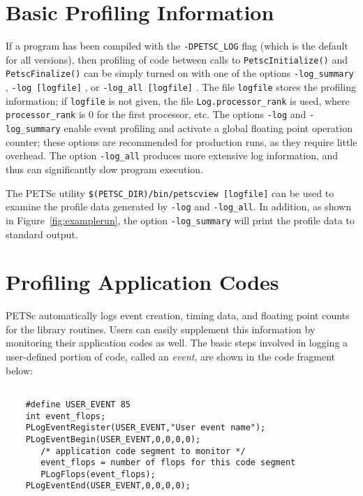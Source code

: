 \section{Basic Profiling Information}

   If a program
has been compiled with the {\tt -DPETSC\_LOG} flag (which is the
default for all versions), then profiling of code between calls to
{\tt PetscInitialize()} and {\tt PetscFinalize()} can be  
simply turned on with one of the options {\tt -log\_summary} 
, {\tt -log [logfile]} , or
{\tt -log\_all [logfile]} .  The file {\tt logfile}
stores the profiling information; if {\tt logfile} is not given, the
file {\tt Log.processor\_rank} is used, where {\tt processor\_rank} is
0 for the first processor, etc.  The options {\tt -log} and 
{\tt -log\_summary} enable event profiling and activate a global floating
point operation counter; these options are recommended for production
runs, as they require little overhead.  The option {\tt -log\_all}
produces more extensive log information, and thus can significantly
slow program execution.

The PETSc utility {\tt \$(PETSC\_DIR)/bin/petscview [logfile]}
 can be used to examine the profile data generated by
{\tt -log} and {\tt -log\_all}. In addition, as shown in 
Figure~\ref{fig:examplerun}, the option 
{\tt -log\_summary}  
will print the profile data to standard output.

\section{Profiling Application Codes}

PETSc automatically logs event creation, timing data, and floating
point counts for the library routines. Users can easily supplement
this information by monitoring their application codes as well.  
The basic steps involved in logging a
user-defined portion of code, called an {\em event}, are shown in the 
code fragment below:
\begin{verbatim}

    #define USER_EVENT 85
    int event_flops;
    PLogEventRegister(USER_EVENT,"User event name");
    PLogEventBegin(USER_EVENT,0,0,0,0);
       /* application code segment to monitor */
       event_flops = number of flops for this code segment
       PLogFlops(event_flops);
    PLogEventEnd(USER_EVENT,0,0,0,0);

\end{verbatim}

